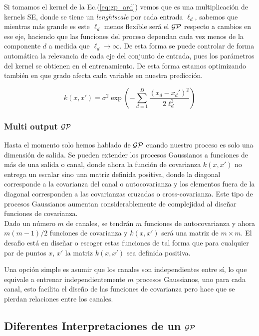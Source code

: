 Si tomamos el kernel de la Ec.(\ref{eq:gp_ard}) vemos que es una multiplicación de kernels SE, donde se tiene un \textit{lenghtscale} por cada entrada $\ell_d$, sabemos que mientras más grande es este $\ell_d$ menos flexible será el $\mathcal{GP}$ respecto a cambios en ese eje, haciendo que las funciones del proceso dependan cada vez menos de la componente $d$ a medida que $\ell_d \rightarrow \infty$. De esta forma se puede controlar de forma automática la relevancia de cada eje del conjunto de entrada, pues los parámetros del kernel se obtienen en el entrenamiento. De esta forma estamos optimizando también en que grado afecta cada variable en nuestra predicción.

\begin{equation}\label{eq:gp_ard}
	k(x, x') = \sigma^2 \exp\left( -\sum_{d=1}^{D} \frac{(x_d - x_d')^2}{2\ell_d^2}\right)
\end{equation}


\subsubsection{Multi output $\mathcal{GP}$}
Hasta el momento solo hemos hablado de $\mathcal{GP}$ cuando nuestro proceso es solo una dimensión de salida. Se pueden extender los procesos Gaussianos a funciones de más de una salida o canal, donde ahora la función de covarianza $k(x, x')$ no entrega un escalar sino una matriz definida positiva, donde la diagonal corresponde a la covarianza del canal o autocovarianza y los elementos fuera de la diagonal corresponden a las covarianzas cruzadas o cross-covarianza. Este tipo de procesos Gaussianos aumentan considerablemente de complejidad al diseñar funciones de covarianza.\\ 

Dado un número $m$ de canales, se tendrán $m$ funciones de autocovarianza y ahora $m(m-1)/2$ funciones de covarianza y $k(x, x')$ será una matriz de $m\times m$. El desafio está en diseñar o escoger estas funciones de tal forma que para cualquier par de puntos $x$, $x'$ la matriz $k(x, x')$ sea definida positiva.

Una opción simple es asumir que los canales son independientes entre sí, lo que equivale a entrenar independientemente $m$ procesos Gaussianos, uno para cada canal, esto facilita el diseño de las funciones de covarianza pero hace que se pierdan relaciones entre los canales.
 

\subsection{Diferentes Interpretaciones de un $\mathcal{GP}$}

